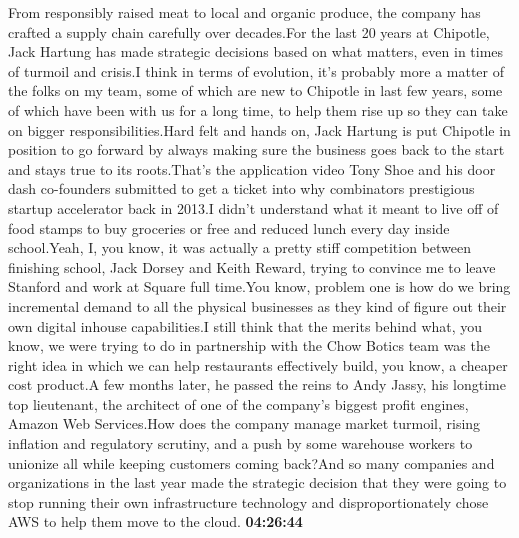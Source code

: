 \documentclass{article}%
\begin{document}
From responsibly raised meat to local and organic produce, the company has crafted a supply chain carefully over decades.For the last 20 years at Chipotle, Jack Hartung has made strategic decisions based on what matters, even in times of turmoil and crisis.I think in terms of evolution, it's probably more a matter of the folks on my team, some of which are new to Chipotle in last few years, some of which have been with us for a long time, to help them rise up so they can take on bigger responsibilities.Hard felt and hands on, Jack Hartung is put Chipotle in position to go forward by always making sure the business goes back to the start and stays true to its roots.That's the application video Tony Shoe and his door dash co{-}founders submitted to get a ticket into why combinators prestigious startup accelerator back in 2013.I didn't understand what it meant to live off of food stamps to buy groceries or free and reduced lunch every day inside school.Yeah, I, you know, it was actually a pretty stiff competition between finishing school, Jack Dorsey and Keith Reward, trying to convince me to leave Stanford and work at Square full time.You know, problem one is how do we bring incremental demand to all the physical businesses as they kind of figure out their own digital inhouse capabilities.I still think that the merits behind what, you know, we were trying to do in partnership with the Chow Botics team was the right idea in which we can help restaurants effectively build, you know, a cheaper cost product.A few months later, he passed the reins to Andy Jassy, his longtime top lieutenant, the architect of one of the company's biggest profit engines, Amazon Web Services.How does the company manage market turmoil, rising inflation and regulatory scrutiny, and a push by some warehouse workers to unionize all while keeping customers coming back?And so many companies and organizations in the last year made the strategic decision that they were going to stop running their own infrastructure technology and disproportionately chose AWS to help them move to the cloud.%
\textbf{04:26:44}%
\newline%
\end{document}

